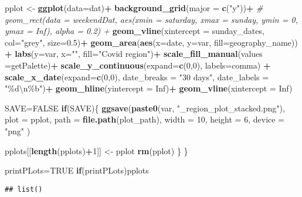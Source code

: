 \documentclass[
]{article}
\newenvironment{Shaded}{\begin{snugshade}}{\end{snugshade}}
\newcommand{\CharTok}[1]{\textcolor[rgb]{0.31,0.60,0.02}{#1}}
\newcommand{\CommentTok}[1]{\textcolor[rgb]{0.56,0.35,0.01}{\textit{#1}}}
\newcommand{\ControlFlowTok}[1]{\textcolor[rgb]{0.13,0.29,0.53}{\textbf{#1}}}
\newcommand{\DataTypeTok}[1]{\textcolor[rgb]{0.13,0.29,0.53}{#1}}
\newcommand{\DecValTok}[1]{\textcolor[rgb]{0.00,0.00,0.81}{#1}}
\newcommand{\FloatTok}[1]{\textcolor[rgb]{0.00,0.00,0.81}{#1}}
\newcommand{\KeywordTok}[1]{\textcolor[rgb]{0.13,0.29,0.53}{\textbf{#1}}}
\newcommand{\NormalTok}[1]{#1}
\newcommand{\OperatorTok}[1]{\textcolor[rgb]{0.81,0.36,0.00}{\textbf{#1}}}
\newcommand{\OtherTok}[1]{\textcolor[rgb]{0.56,0.35,0.01}{#1}}
\newcommand{\StringTok}[1]{\textcolor[rgb]{0.31,0.60,0.02}{#1}}
\begin{document}
\begin{Shaded}
\begin{Highlighting}[]
\NormalTok{pplot \textless{}{-}}\StringTok{ }\KeywordTok{ggplot}\NormalTok{(}\DataTypeTok{data=}\NormalTok{dat)}\OperatorTok{+}
\StringTok{  }\KeywordTok{background\_grid}\NormalTok{(}\DataTypeTok{major =} \KeywordTok{c}\NormalTok{(}\StringTok{"y"}\NormalTok{))}\OperatorTok{+}
\StringTok{ }\CommentTok{\# geom\_rect(data = weekendDat, aes(xmin = saturday, xmax = sunday, ymin = 0, ymax = Inf), alpha = 0.2) +}
\StringTok{  }\KeywordTok{geom\_vline}\NormalTok{(}\DataTypeTok{xintercept =}\NormalTok{ sunday\_dates, }\DataTypeTok{col=}\StringTok{"grey"}\NormalTok{, }\DataTypeTok{size=}\FloatTok{0.5}\NormalTok{)}\OperatorTok{+}
\StringTok{  }\KeywordTok{geom\_area}\NormalTok{(}\KeywordTok{aes}\NormalTok{(}\DataTypeTok{x=}\NormalTok{date, }\DataTypeTok{y=}\NormalTok{var, }\DataTypeTok{fill=}\NormalTok{geography\_name)) }\OperatorTok{+}
\StringTok{    }\KeywordTok{labs}\NormalTok{(}\DataTypeTok{y=}\NormalTok{var, }\DataTypeTok{x=}\StringTok{""}\NormalTok{, }\DataTypeTok{fill=}\StringTok{"Covid region"}\NormalTok{)}\OperatorTok{+}
\StringTok{  }\KeywordTok{scale\_fill\_manual}\NormalTok{(}\DataTypeTok{values =}\NormalTok{getPalette)}\OperatorTok{+}
\StringTok{  }\KeywordTok{scale\_y\_continuous}\NormalTok{(}\DataTypeTok{expand=}\KeywordTok{c}\NormalTok{(}\DecValTok{0}\NormalTok{,}\DecValTok{0}\NormalTok{), }\DataTypeTok{labels=}\NormalTok{comma) }\OperatorTok{+}
\StringTok{  }\KeywordTok{scale\_x\_date}\NormalTok{(}\DataTypeTok{expand=}\KeywordTok{c}\NormalTok{(}\DecValTok{0}\NormalTok{,}\DecValTok{0}\NormalTok{), }\DataTypeTok{date\_breaks =} \StringTok{"30 days"}\NormalTok{, }\DataTypeTok{date\_labels =} \StringTok{"\%d}\CharTok{\textbackslash{}n}\StringTok{\%b"}\NormalTok{)}\OperatorTok{+}
\StringTok{  }\KeywordTok{geom\_hline}\NormalTok{(}\DataTypeTok{yintercept =} \OtherTok{Inf}\NormalTok{)}\OperatorTok{+}
\StringTok{  }\KeywordTok{geom\_vline}\NormalTok{(}\DataTypeTok{xintercept =} \OtherTok{Inf}\NormalTok{)}

\NormalTok{SAVE=}\OtherTok{FALSE}
\ControlFlowTok{if}\NormalTok{(SAVE)\{}
   \KeywordTok{ggsave}\NormalTok{(}\KeywordTok{paste0}\NormalTok{(var, }\StringTok{"\_region\_plot\_stacked.png"}\NormalTok{),}
           \DataTypeTok{plot =}\NormalTok{ pplot,}
           \DataTypeTok{path =} \KeywordTok{file.path}\NormalTok{(plot\_path), }\DataTypeTok{width =} \DecValTok{10}\NormalTok{, }\DataTypeTok{height =} \DecValTok{6}\NormalTok{, }\DataTypeTok{device =} \StringTok{"png"}
\NormalTok{    )}
   
\NormalTok{   pplots[[}\KeywordTok{length}\NormalTok{(pplots)}\OperatorTok{+}\DecValTok{1}\NormalTok{]] \textless{}{-}}\StringTok{ }\NormalTok{pplot}
   \KeywordTok{rm}\NormalTok{(pplot)}
\NormalTok{\}}
\NormalTok{\}}

\NormalTok{printPLots=}\OtherTok{TRUE}
\ControlFlowTok{if}\NormalTok{(printPLots)pplots}
\end{Highlighting}
\end{Shaded}

\begin{verbatim}
## list()
\end{verbatim}
\end{document}
